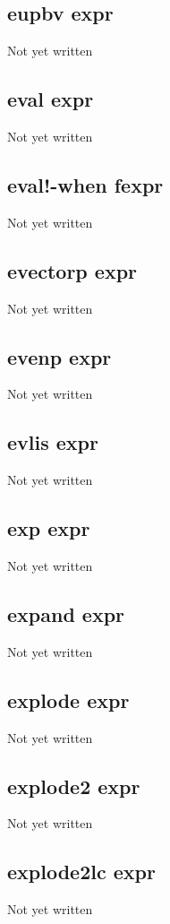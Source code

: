 \documentclass[a4paper,11pt]{article}
\begin{document}
{\subsection{\ttfamily eupbv expr}
   Not yet written

\subsection{\ttfamily eval expr}
   Not yet written

\subsection{\ttfamily eval!-when fexpr}
   Not yet written

\subsection{\ttfamily evectorp expr}
   Not yet written

\subsection{\ttfamily evenp expr}
   Not yet written

\subsection{\ttfamily evlis expr}
   Not yet written

\subsection{\ttfamily exp expr}
   Not yet written

\subsection{\ttfamily expand expr}
   Not yet written

\subsection{\ttfamily explode expr}
   Not yet written

\subsection{\ttfamily explode2 expr}
   Not yet written

\subsection{\ttfamily explode2lc expr}
   Not yet written

}
\end{document}
